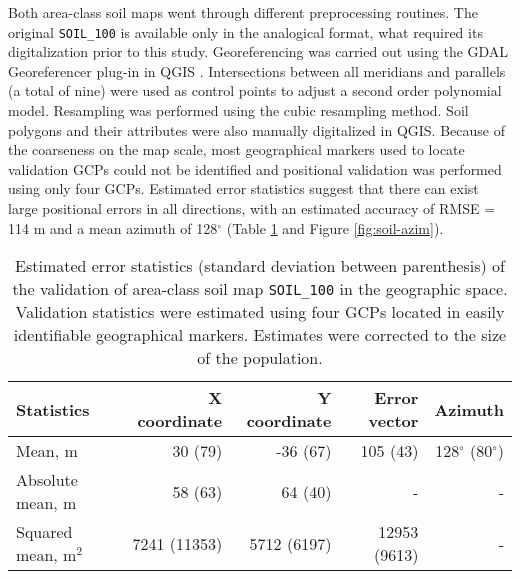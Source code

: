 Both area-class soil maps went through different preprocessing routines. The original \texttt{SOIL\_100} is available only in the analogical format, what required its digitalization prior to this study. Georeferencing was carried out using the GDAL Georeferencer plug-in in QGIS \cite{GDAL2013, QGIS2013}. Intersections between all meridians and parallels (a total of nine) were used as control points to adjust a second order polynomial model. Resampling was performed using the cubic resampling method. Soil polygons and their attributes were also manually digitalized in QGIS. Because of the coarseness on the map scale, most geographical markers used to locate validation GCPs could not be identified and positional validation was performed using only four GCPs. Estimated error statistics suggest that there can exist large positional errors in all directions, with an estimated accuracy of RMSE = 114 m and a mean azimuth of 128$^{\circ}$ (Table \ref{tab:soil-geo-val} and Figure \ref{fig:soil-azim}).

\begin{table}[ht]
  \caption{Estimated error statistics (standard deviation between parenthesis) of the validation of area-class soil map \texttt{SOIL\_100} in the geographic space. Validation statistics were estimated using four GCPs located in easily identifiable geographical markers. Estimates were corrected to the size of the population.}
  \label{tab:soil-geo-val}
  \centering
  {\small
  \begin{tabular}{lrrrr}
    \hline
    Statistics           & X coordinate & Y coordinate & Error vector & Azimuth                  \\
    \hline
    Mean, m              & 30   (79)    & -36  (67)    & 105   (43)   & 128$^\circ$ (80$^\circ$) \\ 
    Absolute mean, m     & 58   (63)    & 64   (40)    & -            & -                        \\ 
    Squared mean, m$^2$  & 7241 (11353) & 5712 (6197)  & 12953 (9613) & -                        \\ 
    \hline
  \end{tabular}}
\end{table}


